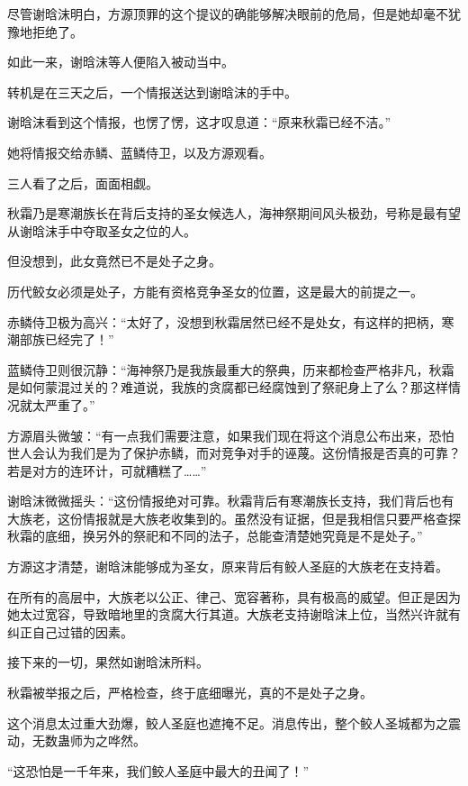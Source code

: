 
\begin{this_body}

尽管谢晗沫明白，方源顶罪的这个提议的确能够解决眼前的危局，但是她却毫不犹豫地拒绝了。

如此一来，谢晗沫等人便陷入被动当中。

转机是在三天之后，一个情报送达到谢晗沫的手中。

谢晗沫看到这个情报，也愣了愣，这才叹息道：“原来秋霜已经不洁。”

她将情报交给赤鳞、蓝鳞侍卫，以及方源观看。

三人看了之后，面面相觑。

秋霜乃是寒潮族长在背后支持的圣女候选人，海神祭期间风头极劲，号称是最有望从谢晗沫手中夺取圣女之位的人。

但没想到，此女竟然已不是处子之身。

历代鲛女必须是处子，方能有资格竞争圣女的位置，这是最大的前提之一。

赤鳞侍卫极为高兴：“太好了，没想到秋霜居然已经不是处女，有这样的把柄，寒潮部族已经完了！”

蓝鳞侍卫则很沉静：“海神祭乃是我族最重大的祭典，历来都检查严格非凡，秋霜是如何蒙混过关的？难道说，我族的贪腐都已经腐蚀到了祭祀身上了么？那这样情况就太严重了。”

方源眉头微皱：“有一点我们需要注意，如果我们现在将这个消息公布出来，恐怕世人会认为我们是为了保护赤鳞，而对竞争对手的诬蔑。这份情报是否真的可靠？若是对方的连环计，可就糟糕了……”

谢晗沫微微摇头：“这份情报绝对可靠。秋霜背后有寒潮族长支持，我们背后也有大族老，这份情报就是大族老收集到的。虽然没有证据，但是我相信只要严格查探秋霜的底细，换另外的祭祀和不同的法子，总能查清楚她究竟是不是处子。”

方源这才清楚，谢晗沫能够成为圣女，原来背后有鲛人圣庭的大族老在支持着。

在所有的高层中，大族老以公正、律己、宽容著称，具有极高的威望。但正是因为她太过宽容，导致暗地里的贪腐大行其道。大族老支持谢晗沫上位，当然兴许就有纠正自己过错的因素。

接下来的一切，果然如谢晗沫所料。

秋霜被举报之后，严格检查，终于底细曝光，真的不是处子之身。

这个消息太过重大劲爆，鲛人圣庭也遮掩不足。消息传出，整个鲛人圣城都为之震动，无数蛊师为之哗然。

“这恐怕是一千年来，我们鲛人圣庭中最大的丑闻了！”


\end{this_body}
